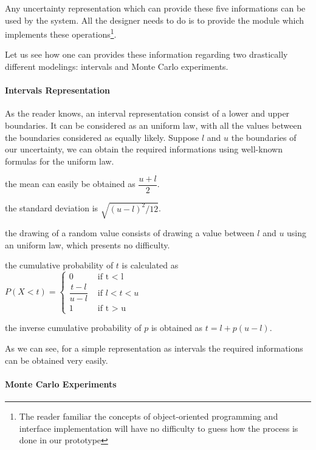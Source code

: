 Any uncertainty representation which can provide these five informations can be used by the system. All the designer needs to do is to provide the module which implements these operations\footnote{The reader familiar the concepts of object-oriented programming and interface implementation will have no difficulty to guess how the process is done in our prototype}.

Let us see how one can provides these information regarding two drastically different modelings: intervals and Monte Carlo experiments.

\paragraph{Intervals Representation}

As the reader knows, an interval representation consist of a lower and upper boundaries. It can be considered as an uniform law, with all the values between the boundaries considered as equally likely. Suppose $l$ and $u$ the boundaries of our uncertainty, we can obtain the required informations using well-known formulas for the uniform law.

\begin{compactitem}
\item the mean can easily be obtained as $\dfrac{u + l}{2}$.
\item the standard deviation is $\sqrt{(u - l)^2 / 12}$.
\item the drawing of a random value consists of drawing a value between $l$ and $u$ using an uniform law, which presents no difficulty.
\item the cumulative probability of $t$ is calculated as $P(X < t) =
			\begin{cases}
				0	&\text{ if t < l}\\
				 \dfrac{t - l }{u - l}	& \text{ if } l < t < u\\
				1	&\text{ if t > u}
			\end{cases}$
\item the inverse cumulative probability of $p$ is obtained as $t = l + p (u - l)$.
\end{compactitem}

As we can see, for a simple representation as intervals the required informations can be obtained very easily.

\paragraph{Monte Carlo Experiments}

